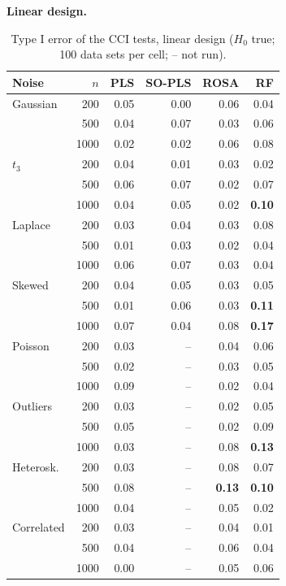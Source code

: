 \documentclass[10pt,leqno]{amsart}
\newcommand{\hi}[1]{\textbf{#1}}            %
\begin{document}
\par\medskip\noindent\textbf{Linear design.}\par\nopagebreak

\begin{table}[H]
\caption{Type I error of the CCI tests, linear design ($H_0$ true; 100 data sets per cell; -- not run).}
\label{tab:cci-type1}
\footnotesize
\begin{tabular}{lrrrrr}
\toprule
Noise & $n$ & PLS & SO-PLS & ROSA & RF \\
\midrule
Gaussian & 200 & 0.05 & 0.00 & 0.06 & 0.04 \\
 & 500 & 0.04 & 0.07 & 0.03 & 0.06 \\
 & 1000 & 0.02 & 0.02 & 0.06 & 0.08 \\
\addlinespace[1pt]
$t_3$ & 200 & 0.04 & 0.01 & 0.03 & 0.02 \\
 & 500 & 0.06 & 0.07 & 0.02 & 0.07 \\
 & 1000 & 0.04 & 0.05 & 0.02 & \hi{0.10} \\
\addlinespace[1pt]
Laplace & 200 & 0.03 & 0.04 & 0.03 & 0.08 \\
 & 500 & 0.01 & 0.03 & 0.02 & 0.04 \\
 & 1000 & 0.06 & 0.07 & 0.03 & 0.04 \\
\addlinespace[1pt]
Skewed & 200 & 0.04 & 0.05 & 0.03 & 0.05 \\
 & 500 & 0.01 & 0.06 & 0.03 & \hi{0.11} \\
 & 1000 & 0.07 & 0.04 & 0.08 & \hi{0.17} \\
\addlinespace[1pt]
Poisson & 200 & 0.03 & -- & 0.04 & 0.06 \\
 & 500 & 0.02 & -- & 0.03 & 0.05 \\
 & 1000 & 0.09 & -- & 0.02 & 0.04 \\
\addlinespace[1pt]
Outliers & 200 & 0.03 & -- & 0.02 & 0.05 \\
 & 500 & 0.05 & -- & 0.02 & 0.09 \\
 & 1000 & 0.03 & -- & 0.08 & \hi{0.13} \\
\addlinespace[1pt]
Heterosk. & 200 & 0.03 & -- & 0.08 & 0.07 \\
 & 500 & 0.08 & -- & \hi{0.13} & \hi{0.10} \\
 & 1000 & 0.04 & -- & 0.05 & 0.02 \\
\addlinespace[1pt]
Correlated & 200 & 0.03 & -- & 0.04 & 0.01 \\
 & 500 & 0.04 & -- & 0.06 & 0.04 \\
 & 1000 & 0.00 & -- & 0.05 & 0.06 \\
\bottomrule
\end{tabular}
\end{table}
\end{document}
